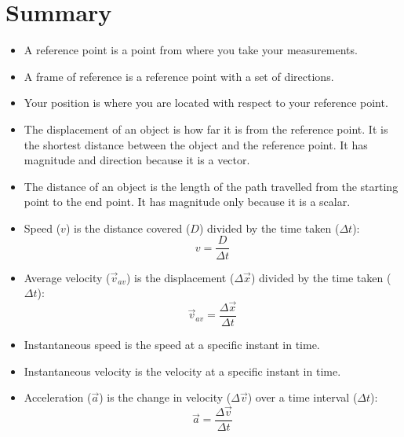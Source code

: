             \section{Summary}
            \nopagebreak
      \label{m38796*id80622}\begin{itemize}[noitemsep]
            \label{m38796*uid154}\item A reference point is a point from where you take your measurements.
\label{m38796*uid155}\item A frame of reference is a reference point with a set of directions.
\label{m38796*uid156}\item Your position is where you are located with respect to your reference point.
\label{m38796*uid157}\item The displacement of an object is how far it is from the reference point. It is the shortest distance between the object and the reference point. It has magnitude and direction because it is a vector.
\label{m38796*uid158}\item The distance of an object is the length of the path travelled from the starting point to the end point. It has magnitude only because it is a scalar.
\label{m38796*uid161}\item Speed ($v$) is the distance covered ($D$) divided by the time taken ($\Delta t$):
\label{m38796*id80758}\nopagebreak\noindent{}
    \begin{equation*}
    v=\frac{D}{\Delta t}
      \end{equation*}
    \label{m38796*uid162}\item Average velocity ($\vec{v}_{av}$) is the displacement ($\Delta \vec{x}$) divided by the time taken ($\Delta t$):
\label{m38796*id80827}\nopagebreak\noindent{}
    \begin{equation*}
    \vec{v}_{av}=\frac{\Delta \vec{x}}{\Delta t}
      \end{equation*}
    \label{m38796*uid163}\item Instantaneous speed is the speed at a specific instant in time.
\label{m38796*uid164}\item Instantaneous velocity is the velocity at a specific instant in time.
\label{m38796*uid165}\item Acceleration ($\vec{a}$) is the change in velocity ($\Delta \vec{v}$) over a time interval ($\Delta t$):
\label{m38796*id80925}\nopagebreak\noindent{}
    \begin{equation*}
    \vec{a}=\frac{\Delta \vec{v}}{\Delta t}
      \end{equation*}

\end{itemize}
